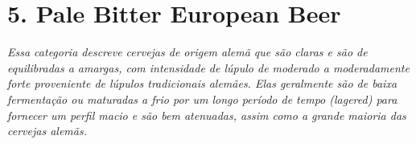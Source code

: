 \section*{5. Pale Bitter European Beer}
\textit{Essa categoria descreve cervejas de origem alemã que são claras e são de equilibradas a amargas, com  intensidade de lúpulo de moderado a moderadamente forte proveniente de lúpulos tradicionais alemães. Elas geralmente são de baixa fermentação ou maturadas a frio por um longo período de tempo (lagered) para fornecer um perfil macio e são bem atenuadas, assim como a grande maioria das cervejas alemãs.}
